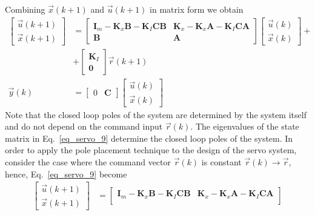 \documentclass[12pt,a4paper,oneside]{book}
\begin{document}
\begin{onehalfspace}
Combining $\vec{x}(k+1)$ and $\vec{u}(k+1)$ in matrix form we obtain
\begin{equation}\label{eq_servo_9}
	\begin{aligned}
		\begin{bmatrix}
			\vec{u}(k+1) \\[6pt]  
			\vec{x}(k+1)
		\end{bmatrix} &=
		\begin{bmatrix}
			\mathbf{I}_m-\mathbf{K}_x\mathbf{B}-\mathbf{K}_I\mathbf{C}\mathbf{B}
			&  \mathbf{K}_x-\mathbf{K}_x\mathbf{A} 
			-\mathbf{K}_I\mathbf{C}\mathbf{A} \\[6pt]
			\mathbf{B} & \mathbf{A}
		\end{bmatrix}
		\begin{bmatrix}
			\vec{u}(k) \\[6pt]  
			\vec{x}(k)
		\end{bmatrix} + \\[6pt]
		&+
		\begin{bmatrix}
			\mathbf{K}_I \\[6pt]  
			\mathbf{0}
		\end{bmatrix}\vec{r}(k+1) \\[6pt]  
		\vec{y}(k) &= 
		\begin{bmatrix}
			0 & \mathbf{C}
		\end{bmatrix}
		\begin{bmatrix}
			\vec{u}(k) \\[6pt]  
			\vec{x}(k)
		\end{bmatrix}
	\end{aligned}
\end{equation}
Note that the closed loop poles of the system are determined by the system 
itself and do not depend on the command input $\vec{r}(k)$. The eigenvalues of 
the state matrix in Eq.~\eqref{eq_servo_9} determine the closed loop poles of 
the 
system.
In order to apply the pole placement technique to the design of the servo 
system, consider the case where the command vector $\vec{r}(k)$ is constant 
$\vec{r}(k) \rightarrow\vec{r}$, hence, Eq.~\eqref{eq_servo_9} become
\begin{equation}\label{eq_servo_10}
	\begin{aligned}
		\begin{bmatrix}
			\vec{u}(k+1) \\[6pt]  
			\vec{x}(k+1)
		\end{bmatrix} &=
		\begin{bmatrix}
			\mathbf{I}_m-\mathbf{K}_x\mathbf{B}-\mathbf{K}_I\mathbf{C}\mathbf{B}
			&  
			\mathbf{K}_x-\mathbf{K}_x\mathbf{A}-\mathbf{K}_I\mathbf{C}\mathbf{A}\\[6pt]
			

\end{bmatrix}
\end{aligned}
\end{equation}
\end{onehalfspace}
\end{document}
